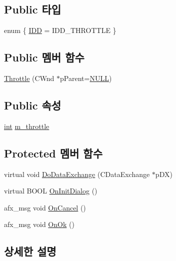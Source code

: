 \subsection*{Public 타입}
\begin{DoxyCompactItemize}
\item 
enum \{ \mbox{\hyperlink{class_throttle_abdcbc5b42292d645e94509c3735773a0af868d2e986217a461e4c8a6d70dabbb3}{I\+DD}} = I\+D\+D\+\_\+\+T\+H\+R\+O\+T\+T\+LE
 \}
\end{DoxyCompactItemize}
\subsection*{Public 멤버 함수}
\begin{DoxyCompactItemize}
\item 
\mbox{\hyperlink{class_throttle_ad87807ba6799b18bfb06e6e7bd3c4b62}{Throttle}} (C\+Wnd $\ast$p\+Parent=\mbox{\hyperlink{_system_8h_a070d2ce7b6bb7e5c05602aa8c308d0c4}{N\+U\+LL}})
\end{DoxyCompactItemize}
\subsection*{Public 속성}
\begin{DoxyCompactItemize}
\item 
\mbox{\hyperlink{_util_8cpp_a0ef32aa8672df19503a49fab2d0c8071}{int}} \mbox{\hyperlink{class_throttle_aba71c48b95cd2a114625ebb3db55bc0b}{m\+\_\+throttle}}
\end{DoxyCompactItemize}
\subsection*{Protected 멤버 함수}
\begin{DoxyCompactItemize}
\item 
virtual void \mbox{\hyperlink{class_throttle_a634843a66c6f1f27b70d8313a88765a5}{Do\+Data\+Exchange}} (C\+Data\+Exchange $\ast$p\+DX)
\item 
virtual B\+O\+OL \mbox{\hyperlink{class_throttle_ac091cd673324246105b4c3d76e25e894}{On\+Init\+Dialog}} ()
\item 
afx\+\_\+msg void \mbox{\hyperlink{class_throttle_a958ff983d0c33bebd3a4035695774eed}{On\+Cancel}} ()
\item 
afx\+\_\+msg void \mbox{\hyperlink{class_throttle_ae8947386977fc3c1e47bea6f3ddb07b8}{On\+Ok}} ()
\end{DoxyCompactItemize}


\subsection{상세한 설명}



